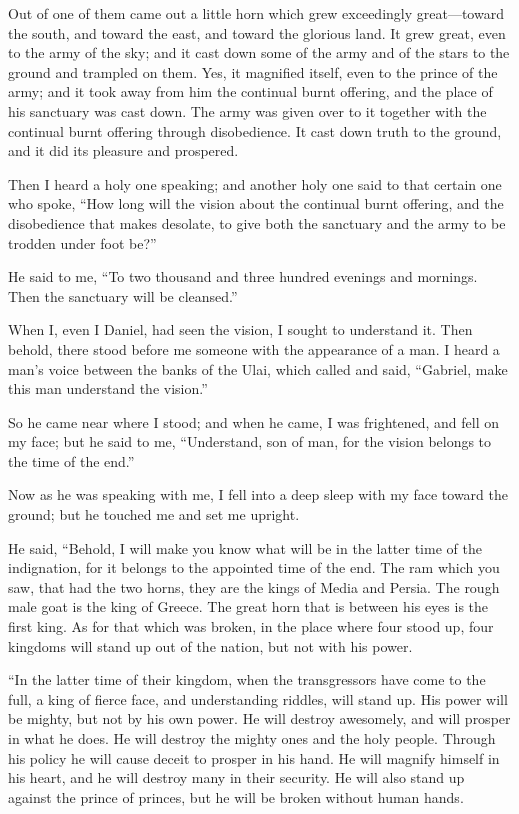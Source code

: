\myverse{}Out of one of them came out a little horn which grew exceedingly
great—toward the south, and toward the east, and toward the glorious land.
\myverse{}It grew great, even to the army of the sky; and it cast down some of the army
and of the stars to the ground and trampled on them.
\myverse{}Yes, it magnified itself, even to the prince of the army; and it took away
from him the continual burnt offering, and the place of his sanctuary was cast down.
\myverse{}The army was given over to it together with the continual burnt offering through
disobedience. It cast down truth to the ground, and it did its pleasure and prospered.

\myverse{}Then I heard a holy one speaking; and another holy one said to
that certain one who spoke, “How long will the vision about the continual burnt offering, and the disobedience
that makes desolate, to give both the sanctuary and the army to be trodden under foot be?”

\myverse{}He said to me, “To two thousand and three hundred evenings and
mornings. Then the sanctuary will be cleansed.”

\myverse{}When I, even I Daniel, had seen the vision, I sought to understand
it. Then behold, there stood before me someone with the appearance of a man.
\myverse{}I heard a man’s voice between the banks of the Ulai, which called and said,
“Gabriel, make this man understand the vision.”

\myverse{}So he came near where I stood; and when he came, I was frightened,
and fell on my face; but he said to me, “Understand, son of man, for the vision belongs to the time of
the end.”

\myverse{}Now as he was speaking with me, I fell into a deep sleep with
my face toward the ground; but he touched me and set me upright.

\myverse{}He said, “Behold, I will make you know what will be in the latter
time of the indignation, for it belongs to the appointed time of the end.
\myverse{}The ram which you saw, that had the two horns, they are the kings of Media
and Persia.
\myverse{}The rough male goat is the king of Greece. The great horn that is between
his eyes is the first king.
\myverse{}As for that which was broken, in the place where four stood up, four kingdoms
will stand up out of the nation, but not with his power.

\myverse{}“In the latter time of their kingdom, when the transgressors
have come to the full, a king of fierce face, and understanding riddles, will stand up.
\myverse{}His power will be mighty, but not by his own power. He will destroy awesomely,
and will prosper in what he does. He will destroy the mighty ones and the holy people.
\myverse{}Through his policy he will cause deceit to prosper in his hand. He will magnify
himself in his heart, and he will destroy many in their security. He will also stand up against the prince
of princes, but he will be broken without human hands.

